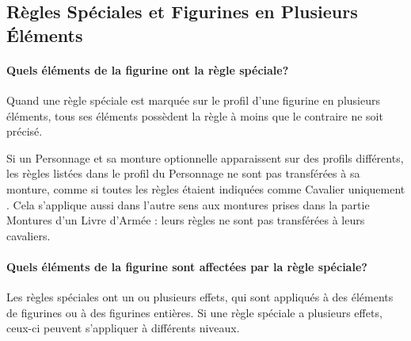 \subsection{Règles Spéciales et Figurines en Plusieurs Éléments}

\paragraph{Quels éléments de la figurine ont la règle spéciale?}

Quand une règle spéciale est marquée sur le profil d'une figurine en plusieurs éléments, tous ses éléments possèdent la règle à moins que le contraire ne soit précisé.

Si un Personnage et sa monture optionnelle apparaissent sur des profils différents, les règles listées dans le profil du Personnage ne sont pas transférées à sa monture, comme si toutes les règles étaient indiquées comme \og Cavalier uniquement \fg{}. Cela s'applique aussi dans l'autre sens aux montures prises dans la partie Montures d'un Livre d'Armée : leurs règles ne sont pas transférées à leurs cavaliers.

\paragraph{Quels éléments de la figurine sont affectées par la règle spéciale?}

Les règles spéciales ont un ou plusieurs effets, qui sont appliqués à des éléments de figurines ou à des figurines entières. Si une règle spéciale a plusieurs effets, ceux-ci peuvent s'appliquer à différents niveaux.

